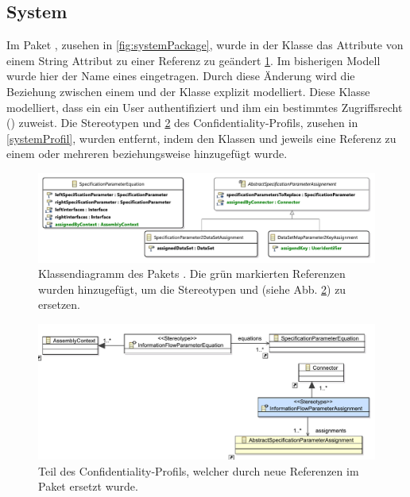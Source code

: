\documentclass[twoside, ngerman]{sdqseminar}
\begin{document}
\subsection{System}
Im Paket , zusehen in \autoref{fig:systemPackage}, wurde in der Klasse  das Attribute  von einem String Attribut zu einer Referenz zu  geändert \ref{fig:systemPackage}. Im bisherigen Modell wurde hier der Name eines  eingetragen. Durch diese Änderung wird die Beziehung zwischen einem  und der Klasse  explizit modelliert. Diese Klasse modelliert, dass ein  ein User authentifiziert und ihm ein bestimmtes Zugriffsrecht () zuweist. Die Stereotypen  und \ref{systemProfil} des Confidentiality-Profils, zusehen in \autoref{systemProfil}, wurden entfernt, indem den Klassen  und  jeweils eine Referenz zu einem oder mehreren  beziehungsweise  hinzugefügt wurde.
\begin{figure}
	\centering
	\includegraphics[width=\textwidth]{images/new/system.pdf}
	\caption{Klassendiagramm des Pakets . Die grün markierten Referenzen wurden hinzugefügt, um die Stereotypen   und  (siehe Abb. \ref{systemProfil}) zu ersetzen.}\label{fig:systemPackage}
\end{figure}
\begin{figure}[htbp]
	\centering
	\includegraphics[width=\textwidth]{images/old/systemProfile.pdf}
	\caption{Teil des Confidentiality-Profils, welcher durch neue Referenzen im Paket  ersetzt wurde.}\label{systemProfil}
\end{figure}
\end{document}
